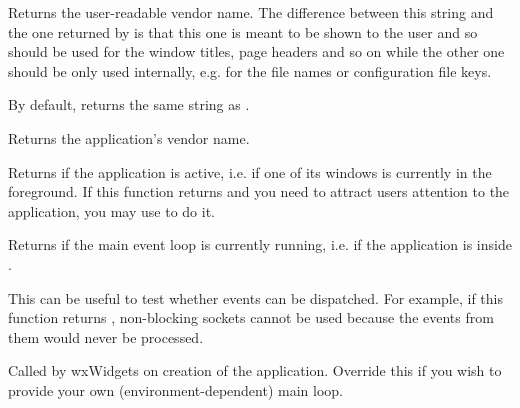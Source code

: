 

\label{wxappgetvendordisplayname}


Returns the user-readable vendor name. The difference between this string
and the one returned by  is that this one
is meant to be shown to the user and so should be used for the window titles,
page headers and so on while the other one should be only used internally, e.g.
for the file names or configuration file keys.

By default, returns the same string as .



\label{wxappgetvendorname}


Returns the application's vendor name.


\label{wxappisactive}


Returns \true if the application is active, i.e. if one of its windows is
currently in the foreground. If this function returns \false and you need to
attract users attention to the application, you may use 
to do it.


\label{wxappismainlooprunning}


Returns \true if the main event loop is currently running, i.e. if the
application is inside .

This can be useful to test whether events can be dispatched. For example,
if this function returns \false, non-blocking sockets cannot be used because
the events from them would never be processed.


\label{wxappmainloop}


Called by wxWidgets on creation of the application. Override this if you wish
to provide your own (environment-dependent) main loop.

